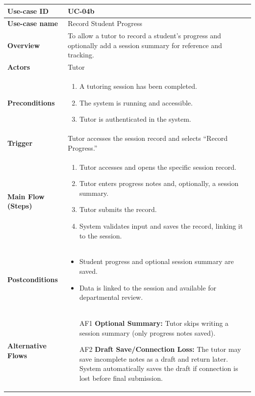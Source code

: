 \begin{table}[H]
\centering
\renewcommand{\arraystretch}{1.3}
\begin{tabular}{|p{3cm}|p{11cm}|}
\hline
\textbf{Use-case ID} & UC-04b \\ 
\hline
\textbf{Use-case name} & Record Student Progress \\ 
\hline
\textbf{Overview} & To allow a tutor to record a student’s progress and optionally add a session summary for reference and tracking. \\ 
\hline
\textbf{Actors} & Tutor \\ 
\hline
\textbf{Preconditions} & 
\begin{enumerate}
    \item A tutoring session has been completed.
    \item The system is running and accessible.
    \item Tutor is authenticated in the system.
\end{enumerate} \\ 
\hline
\textbf{Trigger} & Tutor accesses the session record and selects ``Record Progress.'' \\ 
\hline
\textbf{Main Flow (Steps)} & 
\begin{enumerate}
    \item Tutor accesses and opens the specific session record.
    \item Tutor enters progress notes and, optionally, a session summary.
    \item Tutor submits the record.
    \item System validates input and saves the record, linking it to the session.
\end{enumerate} \\ 
\hline
\textbf{Postconditions} & 
\begin{itemize}
    \item Student progress and optional session summary are saved.
    \item Data is linked to the session and available for departmental review.
\end{itemize} \\ 
\hline
\textbf{Alternative Flows} & 
\begin{itemize}
    \item[AF1] \textbf{Optional Summary:} Tutor skips writing a session summary (only progress notes saved).
    \item[AF2] \textbf{Draft Save/Connection Loss:} The tutor may save incomplete notes as a draft and return later. System automatically saves the draft if connection is lost before final submission.

\end{itemize}
\end{tabular}
\end{table}
